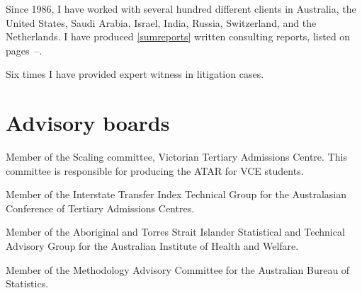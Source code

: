 \documentclass[a4paper,10pt]{article}
\begin{document}
\begin{compactitem}\itemsep=0.1cm
\item Since 1986, I have worked with several hundred different clients in Australia, the United States, Saudi Arabia, Israel, India, Russia, Switzerland, and the Netherlands. I have produced \ref{sumreports} written consulting reports, listed on pages~\pageref{consulting}--\pageref{sumreports}.

\item Six times I have provided expert witness in litigation cases.
\end{compactitem}

\section{Advisory boards}

\begin{compactitem}
\item Member of the Scaling committee, Victorian Tertiary Admissions Centre. This committee is responsible for producing the ATAR for VCE students.
\item Member of the Interstate Transfer Index Technical Group for the Australasian Conference of Tertiary Admissions Centres.
\item Member of the Aboriginal and Torres Strait Islander Statistical and Technical Advisory Group for the Australian Institute of Health and Welfare.
\item Member of the Methodology Advisory Committee for the Australian Bureau of Statistics.
\end{compactitem}


\newpage
\setlength{\bibitemsep}{1.8pt}

\begin{publications}
\end{publications}


\setcounter{sumpapers}{0}
\label{consulting}
\printbibliography[heading=reports,type=report,keyword=consulting]%
\addtocounter{sumpapers}{-1}%
\label{sumreports}

\setcounter{sumpapers}{0}
\newrefcontext[sorting=ty]
\printbibliography[category=software,heading=software]
\addtocounter{sumpapers}{-1}
\label{sumsoftware}
\end{document}
